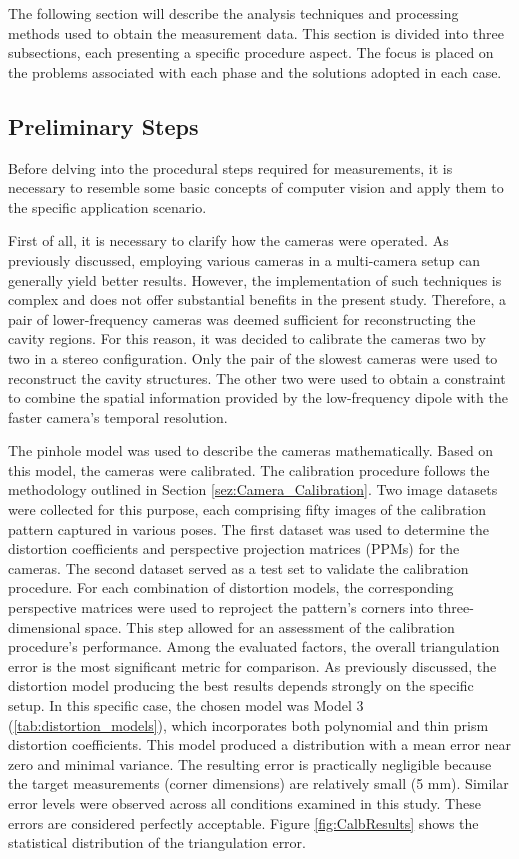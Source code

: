 The following section will describe the analysis techniques and processing methods used to obtain the measurement data. This section is divided into three subsections, each presenting a specific procedure aspect. The focus is placed on the problems associated with each phase and the solutions adopted in each case.

\subsection{Preliminary Steps}
\label{sez:Preliminary_Steps}

Before delving into the procedural steps required for measurements, it is necessary to resemble some basic concepts
of computer vision and apply them to the specific application scenario.

First of all, it is necessary to clarify how the cameras were operated. As previously discussed, employing various cameras in a multi-camera setup can generally yield better results. However, the implementation of such techniques is complex and does not offer substantial benefits in the present study. Therefore, a pair of lower-frequency cameras was deemed sufficient for reconstructing the cavity regions. For this reason, it was decided to calibrate the cameras two by two in a stereo configuration. Only the pair of the slowest cameras were used to reconstruct the cavity structures.
The other two were used to obtain a constraint to combine the spatial information provided by the low-frequency dipole with the faster camera’s temporal resolution.

The pinhole model was used to describe the cameras mathematically. Based on this model, the cameras were calibrated. The calibration procedure follows the methodology outlined in Section \ref{sez:Camera_Calibration}.
Two image datasets were collected for this purpose, each comprising fifty images of the calibration pattern captured in various poses. The first dataset was used to determine the distortion coefficients and perspective projection matrices (PPMs) for the cameras. The second dataset served as a test set to validate the calibration procedure.
For each combination of distortion models, the corresponding perspective matrices were used to reproject the pattern's corners into three-dimensional space. This step allowed for an assessment of the calibration procedure's performance. Among the evaluated factors, the overall triangulation error is the most significant metric for comparison.
As previously discussed, the distortion model producing the best results depends strongly on the specific setup. In this specific case, the chosen model was Model 3 (\ref{tab:distortion_models}), which incorporates both polynomial and thin prism distortion coefficients. This model produced a distribution with a mean error near zero and minimal variance. The resulting error is practically negligible because the target measurements (corner dimensions) are relatively small (5 mm).
Similar error levels were observed across all conditions examined in this study. These errors are considered perfectly acceptable.
Figure \ref{fig:CalbResults} shows the statistical distribution of the triangulation error.

